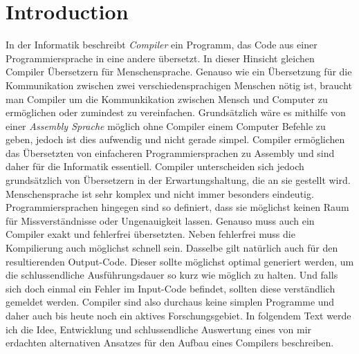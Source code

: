 \chapter{Introduction}
In der Informatik beschreibt \textit{Compiler} ein Programm, das Code aus einer Programmiersprache in eine andere übersetzt. In dieser Hinsicht gleichen Compiler Übersetzern für Menschensprache.
Genauso wie ein Übersetzung für die Kommunikation zwischen zwei verschiedensprachigen Menschen nötig ist, braucht man Compiler um die Kommunkikation zwischen Mensch und Computer zu ermöglichen oder zumindest zu vereinfachen.
Grundsätzlich wäre es mithilfe von einer \textit{Assembly Sprache} möglich ohne Compiler einem Computer Befehle zu geben, jedoch ist dies aufwendig und nicht gerade simpel. 
Compiler ermöglichen das Übersetzten von einfacheren Programmiersprachen zu Assembly und sind daher für die Informatik essentiell.
Compiler unterscheiden sich jedoch grundsätzlich von Übersetzern in der Erwartungshaltung, die an sie gestellt wird. Menschensprache ist sehr komplex und nicht immer besonders eindeutig. 
Programmiersprachen hingegen sind so definiert, dass sie möglichst keinen Raum für Missverständnisse oder Ungenauigkeit lassen. Genauso muss auch ein Compiler exakt und fehlerfrei übersetzten.
Neben fehlerfrei muss die Kompilierung auch möglichst schnell sein. Dasselbe gilt natürlich auch für den resultierenden Output-Code. Dieser sollte möglichst optimal generiert werden, um die schlussendliche
Ausführungsdauer so kurz wie möglich zu halten. Und falls sich doch einmal ein Fehler im Input-Code befindet, sollten diese verständlich gemeldet werden. Compiler sind also durchaus keine simplen Programme und daher auch bis heute noch
ein aktives Forschungsgebiet. In folgendem Text werde ich die Idee, Entwicklung und schlussendliche Auswertung eines von mir erdachten alternativen Ansatzes für den Aufbau eines Compilers beschreiben. 
